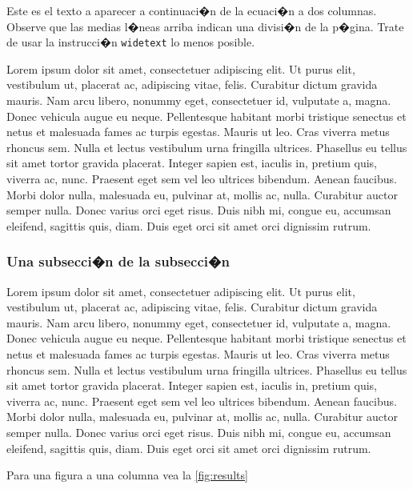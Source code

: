 \documentclass[10pt,twoside]{rcmart} %
\begin{document}
Este es el texto a aparecer a continuaci�n de la ecuaci�n a dos columnas. Observe que las medias l�neas arriba indican una divisi�n de la p�gina. Trate de usar la instrucci�n \texttt{widetext} lo menos posible.

Lorem ipsum dolor sit amet, consectetuer adipiscing elit. Ut purus elit, vestibulum ut, placerat ac, adipiscing vitae, felis. Curabitur dictum gravida mauris. Nam arcu libero, nonummy eget, consectetuer id, vulputate a, magna. Donec vehicula augue eu neque. Pellentesque habitant morbi tristique senectus et netus et malesuada fames ac turpis egestas. Mauris ut leo. Cras viverra metus rhoncus sem. Nulla et lectus vestibulum urna fringilla ultrices. Phasellus eu tellus sit amet tortor gravida placerat. Integer sapien est, iaculis in, pretium quis, viverra ac, nunc. Praesent eget sem vel leo ultrices bibendum. Aenean faucibus. Morbi dolor nulla, malesuada eu, pulvinar at, mollis ac, nulla. Curabitur auctor semper nulla. Donec varius orci eget risus. Duis nibh mi, congue eu, accumsan eleifend, sagittis quis, diam. Duis eget orci sit amet orci dignissim rutrum.

\subsubsection{Una subsecci�n de la subsecci�n}

Lorem ipsum dolor sit amet, consectetuer adipiscing elit. Ut purus elit, vestibulum ut, placerat ac, adipiscing vitae, felis. Curabitur dictum gravida mauris. Nam arcu libero, nonummy eget, consectetuer id, vulputate a, magna. Donec vehicula augue eu neque. Pellentesque habitant morbi tristique senectus et netus et malesuada fames ac turpis egestas. Mauris ut leo. Cras viverra metus rhoncus sem. Nulla et lectus vestibulum urna fringilla ultrices. Phasellus eu tellus sit amet tortor gravida placerat. Integer sapien est, iaculis in, pretium quis, viverra ac, nunc. Praesent eget sem vel leo ultrices bibendum. Aenean faucibus. Morbi dolor nulla, malesuada eu, pulvinar at, mollis ac, nulla. Curabitur auctor semper nulla. Donec varius orci eget risus. Duis nibh mi, congue eu, accumsan eleifend, sagittis quis, diam. Duis eget orci sit amet orci dignissim rutrum.

Para una figura a una columna vea la \ref{fig:results}
\end{document}
